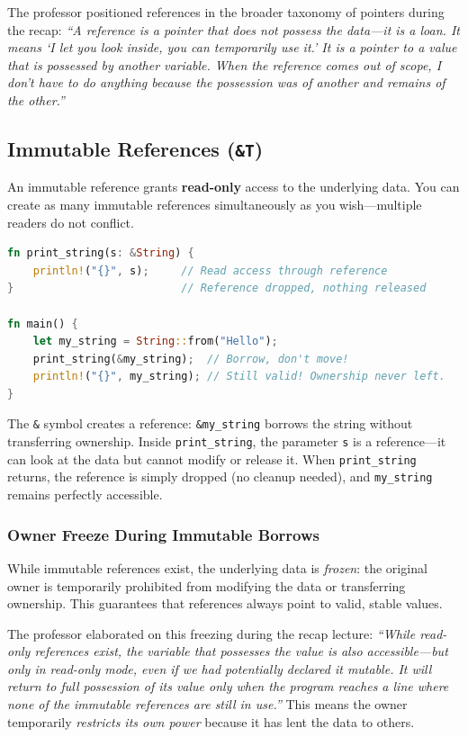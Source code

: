 The professor positioned references in the broader taxonomy of pointers during the recap: \emph{``A reference is a pointer that does not possess the data---it is a loan. It means `I let you look inside, you can temporarily use it.' It is a pointer to a value that is possessed by another variable. When the reference comes out of scope, I don't have to do anything because the possession was of another and remains of the other.''}

\subsection{Immutable References (\texttt{\&T})}

An immutable reference grants \textbf{read-only} access to the underlying data. You can create as many immutable references simultaneously as you wish---multiple readers do not conflict.

\begin{lstlisting}[language=Rust]
fn print_string(s: &String) {
    println!("{}", s);     // Read access through reference
}                          // Reference dropped, nothing released

fn main() {
    let my_string = String::from("Hello");
    print_string(&my_string);  // Borrow, don't move!
    println!("{}", my_string); // Still valid! Ownership never left.
}
\end{lstlisting}

The \texttt{\&} symbol creates a reference: \texttt{\&my\_string} borrows the string without transferring ownership. Inside \texttt{print\_string}, the parameter \texttt{s} is a reference---it can look at the data but cannot modify or release it. When \texttt{print\_string} returns, the reference is simply dropped (no cleanup needed), and \texttt{my\_string} remains perfectly accessible.

\subsubsection{Owner Freeze During Immutable Borrows}

While immutable references exist, the underlying data is \emph{frozen}: the original owner is temporarily prohibited from modifying the data or transferring ownership. This guarantees that references always point to valid, stable values.

The professor elaborated on this freezing during the recap lecture: \emph{``While read-only references exist, the variable that possesses the value is also accessible---but only in read-only mode, even if we had potentially declared it mutable. It will return to full possession of its value only when the program reaches a line where none of the immutable references are still in use.''} This means the owner temporarily \emph{restricts its own power} because it has lent the data to others.

